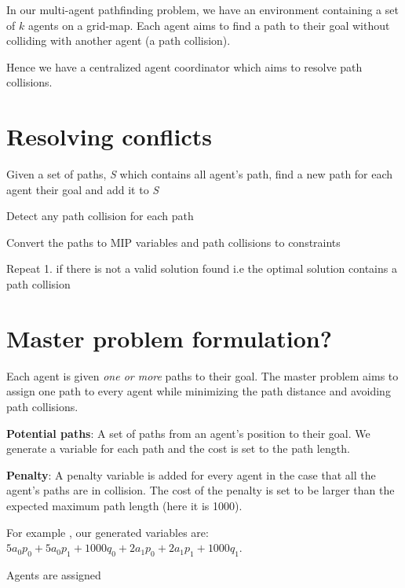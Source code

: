 \documentclass[a4paper,11pt]{article}
\begin{document}
In our multi-agent pathfinding problem, we have an environment containing a set of $k$ agents on a grid-map. Each agent aims to find a path to their goal without colliding with another agent (a path collision).

Hence we have a centralized agent coordinator which aims to resolve path collisions.

\section{Resolving conflicts}
\begin{compactenum}
	\item Given a set of paths, \textit{S} which contains all agent's path, find a new path for each agent their goal and add it to \textit{S}
	\item Detect any path collision for each path
	\item Convert the paths to MIP variables and path collisions to constraints
	\item Repeat 1. if there is not a valid solution found i.e the optimal solution contains a path collision
\end{compactenum}

\section{Master problem formulation?}
Each agent is given \textit{one or more} paths to their goal. The master problem aims to assign one path to every agent while minimizing the path distance and avoiding path collisions. 

\begin{compactitem}
	\item \textbf{Potential paths}: A set of paths from an agent's position to their goal. We generate a variable for each path and the cost is set to the path length.
	\item \textbf{Penalty}: A penalty variable is added for every agent in the case that all the agent's paths are in collision. The cost of the penalty is set to be larger than the expected maximum path length (here it is 1000).
\end{compactitem}

For example \cite{put example!}, our generated variables are: $5a_0p_0 + 5a_0p_1 + 1000q_0 + 2a_1p_0 + 2a_1p_1 + 1000q_1$.

Agents are assigned





	
\end{document}

